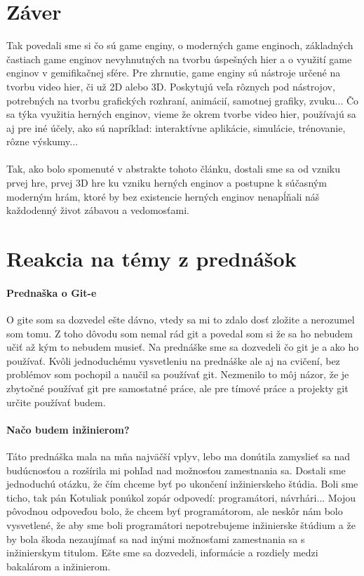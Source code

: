 \documentclass[10pt,oneside,slovak,a4paper,hidelinks]{article}
\begin{document}
	\section{Záver}
		Tak povedali sme si čo sú game enginy, o moderných game enginoch, základných častiach game enginov nevyhnutných na tvorbu úspešných hier a o využití game enginov v gemifikačnej sfére. Pre zhrnutie, game enginy sú nástroje určené na tvorbu video hier, či už 2D alebo 3D. Poskytujú veľa rôznych pod nástrojov, potrebných na tvorbu grafických rozhraní, animácií, samotnej grafiky, zvuku... Čo sa týka využitia herných enginov, vieme že okrem tvorbe video hier, používajú sa aj pre iné účely, ako sú napríklad: interaktívne aplikácie, simulácie, trénovanie, rôzne výskumy...
		\paragraph{}Tak, ako bolo spomenuté v abstrakte tohoto článku, dostali sme sa od vzniku prvej hre\cite{FirstGame}, prvej 3D hre\cite{First3DGame} ku vzniku herných enginov a postupne k súčasným moderným hrám, ktoré by bez existencie herných enginov nenapĺňali náš každodenný život zábavou a vedomosťami.
	\section{Reakcia na témy z prednášok}
		\paragraph{Prednaška o Git-e}
			O gite som sa dozvedel ešte dávno, vtedy sa mi to zdalo dosť zložite a nerozumel som tomu. Z toho dôvodu som nemal rád git a povedal som si že sa ho nebudem učiť až kým to nebudem musieť. Na prednáške sme sa dozvedeli čo git je a ako ho používať. Kvôli jednoduchému vysvetleniu na prednáške ale aj na cvičení, bez problémov som pochopil a naučil sa používať git. Nezmenilo to môj názor, že je zbytočné používať git pre samostatné práce, ale pre tímové práce a projekty git určite používať budem.
		\paragraph{Načo budem inžinierom?}
			Táto prednáška mala na mňa najväčší vplyv, lebo ma donútila zamyslieť sa nad budúcnosťou a rozšírila mi pohľad nad možnosťou zamestnania sa. Dostali sme jednoduchú otázku, že čím chceme byť po ukončení inžinierskeho štúdia. Boli sme ticho, tak pán Kotuliak ponúkol zopár odpovedí: programátori, návrhári... Mojou pôvodnou odpoveďou bolo, že chcem byť programátorom, ale neskôr nám bolo vysvetlené, že aby sme boli programátori nepotrebujeme inžinierske štúdium a že by bola škoda nezaujímať sa nad inými možnosťami zamestnania sa s inžinierskym titulom. Ešte sme sa dozvedeli, informácie a rozdiely medzi bakalárom a inžinierom.
\end{document}

